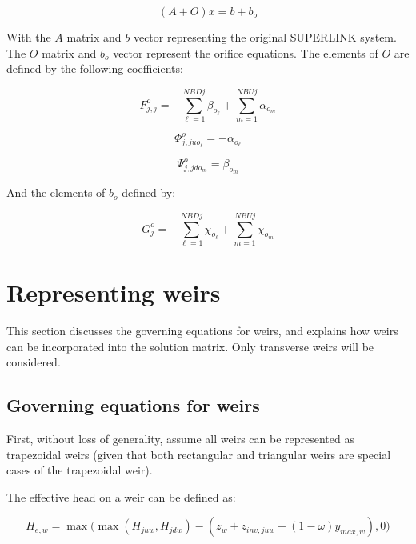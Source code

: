 \documentclass[11pt]{article}
\begin{document}
\begin{equation}
  (A + O) x = b + b_o
\end{equation}

With the $A$ matrix and $b$ vector representing the original SUPERLINK system.
The $O$ matrix and $b_o$ vector represent the orifice equations. The elements of
$O$ are defined by the following coefficients:

\begin{equation}
  \boxed{
  F_{j,j}^o = - \sum_{\ell=1}^{NBDj} \beta_{o_\ell} + \sum_{m=1}^{NBUj} \alpha_{o_m}
  }
\end{equation}

\begin{equation}
  \boxed{
  \Phi_{j,juo_\ell}^o = - \alpha_{o_\ell}
  }
\end{equation}

\begin{equation}
  \boxed{
  \Psi_{j,jdo_m}^o = \beta_{o_m}
  }
\end{equation}

And the elements of $b_o$ defined by:

\begin{equation}
  \boxed{
  G_j^o = - \sum_{\ell=1}^{NBDj} \chi_{o_\ell} + \sum_{m=1}^{NBUj} \chi_{o_m}
  }
\end{equation}

\section{Representing weirs}

This section discusses the governing equations for weirs, and explains how weirs
can be incorporated into the solution matrix. Only transverse weirs will be considered.

\subsection{Governing equations for weirs}

First, without loss of generality, assume all weirs can be represented as
trapezoidal weirs (given that both rectangular and triangular weirs are special
cases of the trapezoidal weir).

The effective head on a weir can be defined as:

\begin{equation}
  H_{e,w} = \max{ \biggl(\max{(H_{juw}, H_{jdw})} - (z_w + z_{inv,juw} + (1 - \omega) y_{max,w}), 0 \biggr)}
\end{equation}
\end{document}
